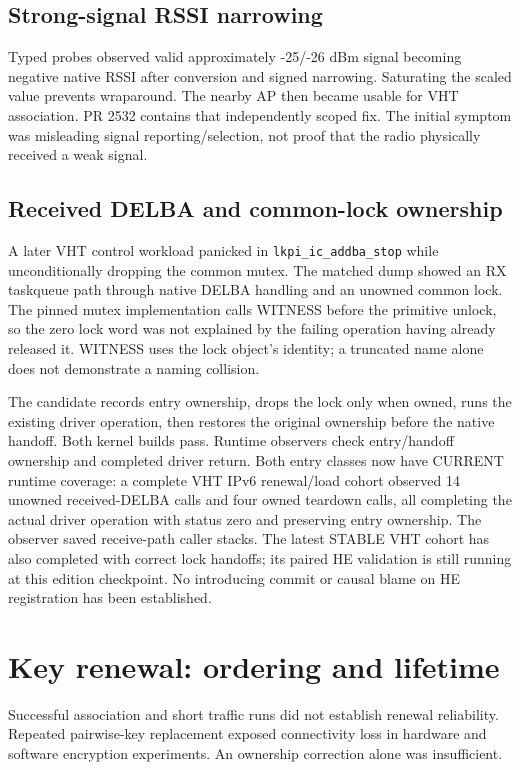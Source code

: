 \documentclass[11pt,letterpaper,oneside]{article}
\newcommand{\code}[1]{\texttt{\small #1}}
\begin{document}
\subsection{Strong-signal RSSI narrowing}
Typed probes observed valid approximately -25/-26 dBm signal becoming negative native RSSI after conversion and signed narrowing. Saturating the scaled value prevents wraparound. The nearby AP then became usable for VHT association. PR 2532 contains that independently scoped fix. The initial symptom was misleading signal reporting/selection, not proof that the radio physically received a weak signal.

\subsection{Received DELBA and common-lock ownership}
A later VHT control workload panicked in \code{lkpi\_ic\_addba\_stop} while unconditionally dropping the common mutex. The matched dump showed an RX taskqueue path through native DELBA handling and an unowned common lock. The pinned mutex implementation calls WITNESS before the primitive unlock, so the zero lock word was not explained by the failing operation having already released it. WITNESS uses the lock object's identity; a truncated name alone does not demonstrate a naming collision.

The candidate records entry ownership, drops the lock only when owned, runs the existing driver operation, then restores the original ownership before the native handoff. Both kernel builds pass. Runtime observers check entry/handoff ownership and completed driver return. Both entry classes now have CURRENT runtime coverage: a complete VHT IPv6 renewal/load cohort observed 14 unowned received-DELBA calls and four owned teardown calls, all completing the actual driver operation with status zero and preserving entry ownership. The observer saved receive-path caller stacks. The latest STABLE VHT cohort has also completed with correct lock handoffs; its paired HE validation is still running at this edition checkpoint. No introducing commit or causal blame on HE registration has been established.

\section{Key renewal: ordering and lifetime}
Successful association and short traffic runs did not establish renewal reliability. Repeated pairwise-key replacement exposed connectivity loss in hardware and software encryption experiments. An ownership correction alone was insufficient.
\end{document}

